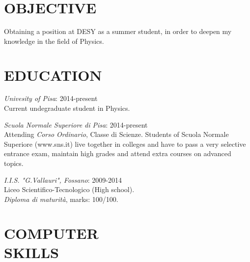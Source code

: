 \documentclass[margin, 10pt]{res} %
\begin{document}
\begin{resume}

 
\section{OBJECTIVE}  

Obtaining a position at DESY as a summer student, in order to deepen my knowledge in the field of Physics.



\section{EDUCATION}

{\sl Univesity of Pisa}:   \hfill 2014-present \\
Current undegraduate student in Physics.

{\sl Scuola Normale Superiore di Pisa}: \hfill 2014-present \\
Attending \textit{Corso Ordinario}, Classe di Scienze.
Students of Scuola Normale Superiore (www.sns.it) live together in colleges and have to pass a very selective entrance exam, maintain high grades and attend extra courses on advanced topics.

{\sl I.I.S. "G.Vallauri", Fossano}:  \hfill 2009-2014 \\
Liceo Scientifico-Tecnologico (High school).\\ 
\textit{Diploma di maturit\`a}, marks: 100/100.


 

\section{COMPUTER \\ SKILLS} 


\end{resume}
\end{document}
